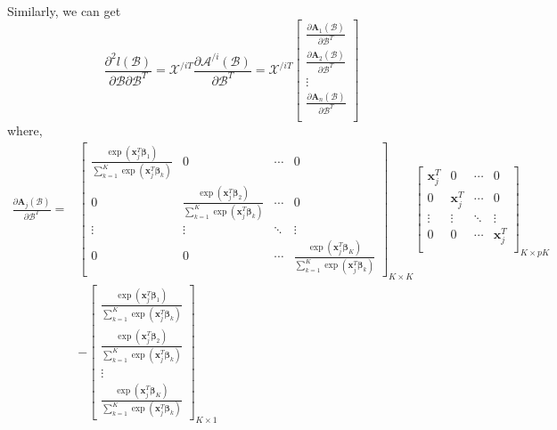 \documentclass[letter]{article}
\begin{document}
	\\
	
	Similarly, we can get
	$$\frac{\partial^2l(\bm{\mathcal{B}})}{\partial\bm{\mathcal{B}}\partial\bm{\mathcal{B}}^T}=\bm{\mathcal{X}}^{/iT}\frac{\partial \bm{\mathcal{A}}^{/i}(\bm{\mathcal{B}})}{\partial\bm{\mathcal{B}}^T}=
	\bm{\mathcal{X}}^{/iT}\begin{bmatrix}
	\frac{\partial \bm{A}_1(\bm{\mathcal{B}})}{\partial\bm{\mathcal{B}}^T} \\
	\frac{\partial \bm{A}_2(\bm{\mathcal{B}})}{\partial\bm{\mathcal{B}}^T} \\
	\vdots \\
	\frac{\partial \bm{A}_n(\bm{\mathcal{B}})}{\partial\bm{\mathcal{B}}^T} \\
	\end{bmatrix}$$
	where,
	$$\begin{aligned}\frac{\partial \bm{A}_j(\bm{\mathcal{B}})}{\partial\bm{\mathcal{B}}^T}=&
	\begin{bmatrix}
	\frac{\exp\left(\bm{x}_j^T\bm{\beta}_1\right)}{\sum_{k=1}^K\exp\left(\bm{x}_j^T\bm{\beta}_k\right)} & 0 & \cdots & 0 \\
	0 & \frac{\exp\left(\bm{x}_j^T\bm{\beta}_2\right)}{\sum_{k=1}^K\exp\left(\bm{x}_j^T\bm{\beta}_k\right)} & \cdots & 0 \\
	\vdots & \vdots & \ddots & \vdots \\
	0 & 0 & \cdots &  \frac{\exp\left(\bm{x}_j^T\bm{\beta}_K\right)}{\sum_{k=1}^K\exp\left(\bm{x}_j^T\bm{\beta}_k\right)}
	\end{bmatrix}_{K\times K}
	\begin{bmatrix}
	\bm{x}_j^T & 0 & \cdots & 0 \\
	0 & \bm{x}_j^T & \cdots & 0 \\
	\vdots & \vdots & \ddots & \vdots \\
	0 & 0 & \cdots & \bm{x}_j^T \\
	\end{bmatrix}_{K\times pK} \\
	&-\begin{bmatrix}
	\frac{\exp\left(\bm{x}_j^T\bm{\beta}_1\right)}{\sum_{k=1}^K\exp\left(\bm{x}_j^T\bm{\beta}_k\right)} \\
	\frac{\exp\left(\bm{x}_j^T\bm{\beta}_2\right)}{\sum_{k=1}^K\exp\left(\bm{x}_j^T\bm{\beta}_k\right)} \\
	\vdots \\
	\frac{\exp\left(\bm{x}_j^T\bm{\beta}_K\right)}{\sum_{k=1}^K\exp\left(\bm{x}_j^T\bm{\beta}_k\right)}
	\end{bmatrix}_{K\times 1}

\end{aligned}$$
\end{document}
